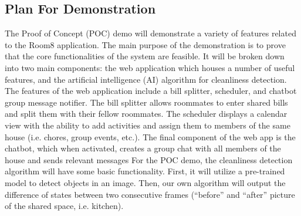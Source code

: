 \documentclass[12pt, titlepage]{article}
\begin{document}
\subsection{Plan For Demonstration}
The Proof of Concept (POC) demo will demonstrate a variety of features related to the Room8 application. The main purpose of the demonstration is to prove that the core functionalities of the system are feasible. It will be broken down into two main components: the web application which houses a number of useful features, and the artificial intelligence (AI) algorithm for cleanliness detection. The features of the web application include a bill splitter, scheduler, and chatbot group message notifier. The bill splitter allows roommates to enter shared bills and split them with their fellow roommates. The scheduler displays a calendar view with the ability to add activities and assign them to members of the same house (i.e. chores, group events, etc.). The final component of the web app is the chatbot, which when activated, creates a group chat with all members of the house and sends relevant messages For the POC demo, the cleanliness detection algorithm will have some basic functionality. First, it will utilize a pre-trained model to detect objects in an image. Then, our own algorithm will output the difference of states between two consecutive frames (“before” and “after” picture of the shared space, i.e. kitchen).
\end{document}
